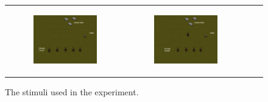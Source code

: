 \documentclass[11pt,letterpaper]{article}
\begin{document}
\begin{figure}
{\begin{tabular}{cccc}
\begin{subfigure}[b]{0.18\textwidth}\includegraphics[width=\textwidth]{figures/turrets.jpeg}\caption{}\label{fig:turrets-a}\end{subfigure}&
\begin{subfigure}[b]{0.18\textwidth}\includegraphics[width=\textwidth]{figures/turrets-plus-one.jpeg}\caption{}\label{fig:turrets-b}\end{subfigure}
\end{tabular}
}
\caption{The stimuli used in the experiment.}
\label{fig:exp_stimuli}
\end{figure}

\end{document}
